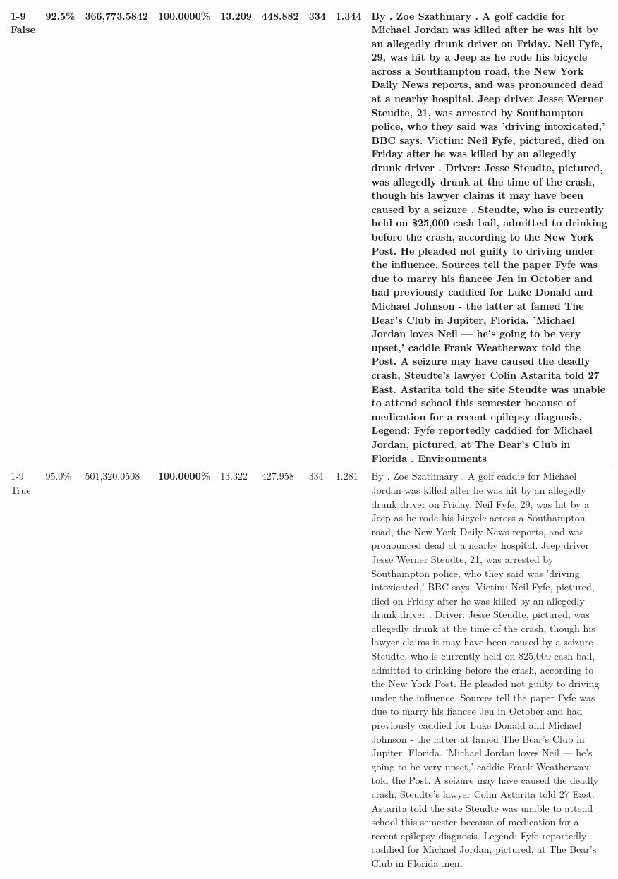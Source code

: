 \begin{table}[H]
\begin{tabular}{lllrlllll}
\cline{1-9}
False & 92.5\% & 366,773.5842 & \bfseries \color{red} 100.0000\% & 13.209 & 448.882 & 334 & 1.344 & By . Zoe Szathmary . A golf caddie for Michael Jordan was killed after he was hit by an allegedly drunk driver on Friday. Neil Fyfe, 29, was hit by a Jeep as he rode his bicycle across a Southampton road, the New York Daily News reports, and was pronounced dead at a nearby hospital. Jeep driver Jesse Werner Steudte, 21, was arrested by Southampton police, who they said was 'driving intoxicated,' BBC says. Victim: Neil Fyfe, pictured, died on Friday after he was killed by an allegedly drunk driver . Driver: Jesse Steudte, pictured, was allegedly drunk at the time of the crash, though his lawyer claims it may have been caused by a seizure . Steudte, who is currently held on \$25,000 cash bail, admitted to drinking before the crash, according to the New York Post. He pleaded not guilty to driving under the influence. Sources tell the paper Fyfe was due to marry his fiancee Jen in October and had previously caddied for Luke Donald and Michael Johnson - the latter at famed The Bear's Club in Jupiter, Florida. 'Michael Jordan loves Neil — he’s going to be very upset,' caddie Frank Weatherwax told the Post. A seizure may have caused the deadly crash, Steudte's lawyer Colin Astarita told 27 East. Astarita told the site Steudte was unable to attend school this semester because of medication for a recent epilepsy diagnosis. Legend: Fyfe reportedly caddied for Michael Jordan, pictured, at The Bear's Club in Florida . Environments \\
\cline{1-9}
True & 95.0\% & 501,320.0508 & \bfseries \color{red} 100.0000\% & 13.322 & 427.958 & 334 & 1.281 & By . Zoe Szathmary . A golf caddie for Michael Jordan was killed after he was hit by an allegedly drunk driver on Friday. Neil Fyfe, 29, was hit by a Jeep as he rode his bicycle across a Southampton road, the New York Daily News reports, and was pronounced dead at a nearby hospital. Jeep driver Jesse Werner Steudte, 21, was arrested by Southampton police, who they said was 'driving intoxicated,' BBC says. Victim: Neil Fyfe, pictured, died on Friday after he was killed by an allegedly drunk driver . Driver: Jesse Steudte, pictured, was allegedly drunk at the time of the crash, though his lawyer claims it may have been caused by a seizure . Steudte, who is currently held on \$25,000 cash bail, admitted to drinking before the crash, according to the New York Post. He pleaded not guilty to driving under the influence. Sources tell the paper Fyfe was due to marry his fiancee Jen in October and had previously caddied for Luke Donald and Michael Johnson - the latter at famed The Bear's Club in Jupiter, Florida. 'Michael Jordan loves Neil — he’s going to be very upset,' caddie Frank Weatherwax told the Post. A seizure may have caused the deadly crash, Steudte's lawyer Colin Astarita told 27 East. Astarita told the site Steudte was unable to attend school this semester because of medication for a recent epilepsy diagnosis. Legend: Fyfe reportedly caddied for Michael Jordan, pictured, at The Bear's Club in Florida .nem \\

\end{tabular}
\end{table}
